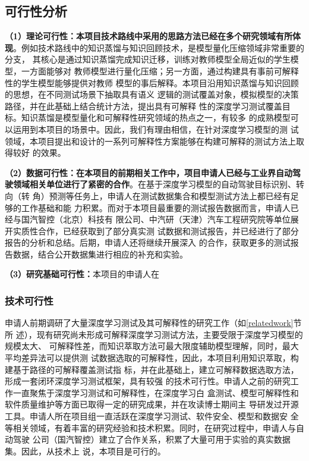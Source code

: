 \subsection{可行性分析}

\textbf{（1）理论可行性：本项目技术路线中采用的思路方法已经在多个研究领域有所体
现}。例如技术路线中的知识蒸馏与知识回顾技术，是模型量化压缩领域非常重要的分支，
其核心是通过知识蒸馏完成知识迁移，训练对教师模型全局近似的学生模型，一方面能够对
教师模型进行量化压缩；另一方面，通过构建具有事前可解释性的学生模型能够提供对教师
模型的事后解释。本项目沿用知识蒸馏与知识回顾的思想，在不同测试场景下抽取具有语义
逻辑的测试覆盖对象，模拟模型的决策路径，并在此基础上结合统计方法，提出具有可解释
性的深度学习测试覆盖目标。知识蒸馏是模型量化和可解释性研究领域的热点之一，有较多
的成熟模型可以运用到本项目的场景中。因此，我们有理由相信，在针对深度学习模型的测
试领域，本项目提出和设计的一系列可解释性方案能够在构建可解释的测试方法上取得较好
的效果。

\textbf{（2）数据可行性：在本项目的前期相关工作中，项目申请人已经与工业界自动驾
驶领域相关单位进行了紧密的合作}。在基于深度学习模型的自动驾驶目标识别、转向（转
角）预测等任务上，申请人在测试数据集合和模型测试方法上都已经有足够的工作基础和能
力积累。而对于本项目最重要的测试报告数据而言，申请人已经与国汽智控（北京）科技有
限公司、中汽研（天津）汽车工程研究院等单位展开实质性合作，已经获取到了部分真实测
试数据和测试报告，并已经进行了部分报告的分析和总结。后期，申请人还将继续开展深入
的合作，获取更多的测试报告数据，结合公开数据集进行相应的补充和实验。

\textbf{（3）研究基础可行性：}本项目的申请人在

\subsubsection{技术可行性}

申请人前期调研了大量深度学习测试及其可解释性的研究工作（如\ref{relatedwork}节所
述），现有研究尚未形成可解释深度学习测试方法，主要受限于深度学习模型的规模太大、
可解释性差，而知识萃取方法可最大限度辅助模型理解，同时，最大平均差异法可以提供测
试数据选取的可解释性，因此，本项目利用知识萃取，构建基于路径的可解释覆盖测试指
标，并在此基础上，建立可解释数据选取方法，形成一套闭环深度学习测试框架，具有较强
的技术可行性。申请人之前的研究工作一直聚焦于深度学习测试和可解释性，在深度学习白
盒测试、模型可解释性和软件质量维护等方面已取得一定的研究成果，并在攻读博士期间主
导研发过开源工具。申请人所在项目组一直活跃在深度学习测试、软件安全、模型和数据安
全等相关领域，有着丰富的研究经验和技术积累。同时，在研究过程中，申请人与自动驾驶
公司（国汽智控）建立了合作关系，积累了大量可用于实验的真实数据集。因此，从技术上
说，本项目是可行的。

